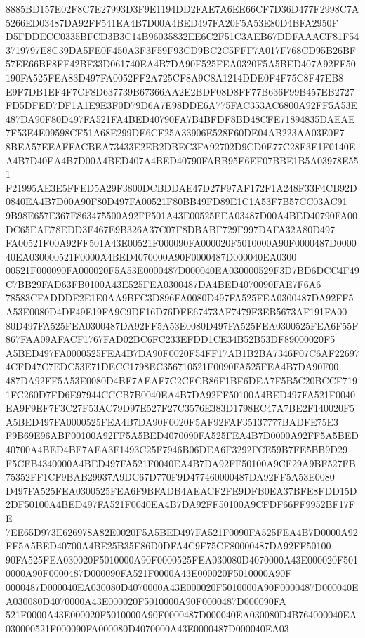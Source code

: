 \documentclass[UTF8,fontset=fandol,zihao=-4,a4paper]{ctexart}
\begin{document}
{{8885BD157E02F8C7E27993D3F9E1194DD2FAE7A6EE66CF7D36D477F2998C7A5266ED03487DA92FF541EA4B7D00A4BED497FA20F5A53E80D4BFA2950F
D5FDDECC0335BFCD3B3C14B96035832EE6C2F51C3AEB67DDFAAACF81F543719797E8C39DA5FE0F450A3F3F59F93CD9BC2C5FFF7A017F768CD95B26BF
57EE66BF8FF42BF33D061740EA4B7DA90F525FEA0320F5A5BED407A92FF50190FA525FEA83D497FA0052FF2A725CF8A9C8A1214DDE0F4F75C8F47EB8
E9F7DB1EF4F7CF8D637739B67366AA2E2BDF08D8FF77B636F99B457EB2727FD5DFED7DF1A1E9E3F0D79D6A7E98DDE6A775FAC353AC6800A92FF5A53E
487DA90F80D497FA521FA4BED40790FA7B4BFDF8BD48CFE71894835DAEAE7F53E4E09598CF51A68E299DE6CF25A33906E528F60DE04AB223AA03E0F7
8BEA57EEAFFACBEA73433E2EB2DBEC3FA92702D9CD0E77C28F3E1F0140EA4B7D40EA4B7D00A4BED407A4BED40790FABB95E6EF07BBE1B5A03978E551
F21995AE3E5FFED5A29F3800DCBDDAE47D27F97AF172F1A248F33F4CB92D0840EA4B7D00A90F80D497FA00521F80BB49FD89E1C1A53F7B57CC03AC91
9B98E657E367E863475500A92FF501A43E00525FEA03487D00A4BED40790FA00DC65EAE78EDD3F467E9B326A37C07F8DBABF729F997DAFA32A80D497
FA00521F00A92FF501A43E00521F000090FA000020F5010000A90F0000487D000040EA030000521F0000A4BED4070000A90F0000487D000040EA0300
00521F000090FA000020F5A53E0000487D000040EA030000529F3D7BD6DCC4F49C7BB29FAD63FB0100A43E525FEA0300487DA4BED4070090FAE7F6A6
78583CFADDDE2E1E0AA9BFC3D896FA0080D497FA525FEA0300487DA92FF5A53E0080D4DF49E19FA9C9DF16D76DFE67473AF7479F3EB5673AF191FA00
80D497FA525FEA0300487DA92FF5A53E0080D497FA525FEA0300525FEA6F55F867FAA09AFACF1767FAD02BC6FC233EFDD1CE34B52B53DF89000020F5
A5BED497FA0000525FEA4B7DA90F0020F54FF17AB1B2BA7346F07C6AF226974CFD47C7EDC53E71DECC1798EC356710521F0090FA525FEA4B7DA90F00
487DA92FF5A53E0080D4BF7AEAF7C2CFCB86F1BF6DEA7F5B5C20BCCF7191FC260D7FD6E97944CCCB7B0040EA4B7DA92FF50100A4BED497FA521F0040
EA9F9EF7F3C27F53AC79D97E527F27C3576E383D1798EC47A7BE2F140020F5A5BED497FA0000525FEA4B7DA90F0020F5AF92FAF35137777BADFE75E3
F9B69E96ABF00100A92FF5A5BED4070090FA525FEA4B7D0000A92FF5A5BED40700A4BED4BF7AEA3F1493C25F7946B06DEA6F3292FCE59B7FE5BB9D29
F5CFB4340000A4BED497FA521F0040EA4B7DA92FF50100A9CF29A9BF527FB75352FF1CF9BAB29937A9DC67D770F9D477460000487DA92FF5A53E0080
D497FA525FEA0300525FEA6F9BFADB4AEACF2FE9DFB0EA37BFE8FDD15D2DF50100A4BED497FA521F0040EA4B7DA92FF50100A9CFDF66FF9952BF17FE
7EE65D973E626978A82E0020F5A5BED497FA521F0090FA525FEA4B7D0000A92FF5A5BED40700A4BE25B35E86D0DFA4C9F75CF80000487DA92FF50100
90FA525FEA030020F5010000A90F0000525FEA030080D4070000A43E000020F5010000A90F0000487D000090FA521F0000A43E000020F5010000A90F
0000487D000040EA030080D4070000A43E000020F5010000A90F0000487D000040EA030080D4070000A43E000020F5010000A90F0000487D000090FA
521F0000A43E000020F5010000A90F0000487D000040EA030080D4B764000040EA030000521F000090FA000080D4070000A43E0000487D000040EA03
}}
\end{document}
